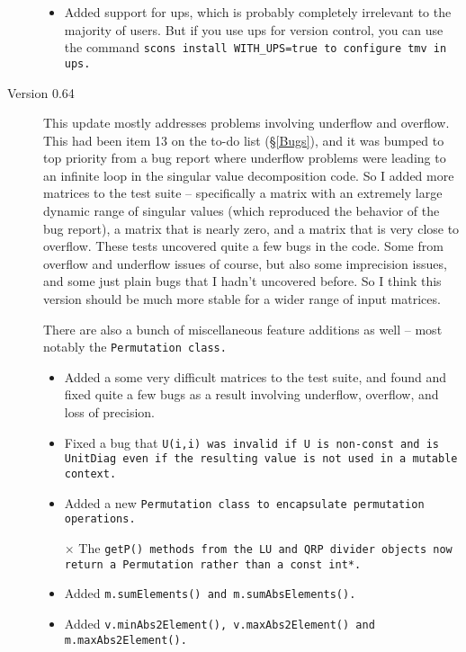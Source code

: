 \begin{description}
\begin{itemize}
\item
Added support for ups, which is probably completely irrelevant
to the majority of users.  But if you use ups for version control, you can
use the command \tt{scons install WITH\_UPS=true} to configure tmv in ups.

\end{itemize}

\item[Version 0.64]
This update mostly addresses problems involving underflow and overflow.  This had 
been item 13 on the to-do list (\S\ref{Bugs}), and it was bumped to top priority from
a bug report where underflow problems were leading to an infinite loop in the 
singular value decomposition code.  So I added more matrices to the test suite -- 
specifically a matrix with an extremely large dynamic range of singular values
(which reproduced the behavior of the bug report), a matrix that is nearly zero,
and a matrix that is very close to overflow.  These tests uncovered quite a few bugs 
in the code.  Some from overflow and underflow issues of course, but also some
imprecision issues, and some just plain bugs that I hadn't uncovered before.  So 
I think this version should be much more stable for a wider range of input matrices.

There are also a bunch of miscellaneous feature additions as well -- most notably the \tt{Permutation} class.

\begin{itemize}

\item
Added a some very difficult matrices to the test suite, and found and fixed quite a few 
bugs as a result involving underflow, overflow, and loss of precision.  

\item 
Fixed a bug that \tt{U(i,i)} was invalid if \tt{U} is non-const and is \tt{UnitDiag} even 
if the resulting value is not used in a mutable context.  

\item 
Added a new \tt{Permutation} class to encapsulate permutation operations.  

\item[$\times$] 
The \tt{getP()} methods from the LU and QRP divider objects now return
a \tt{Permutation} rather than a \tt{const int*}.  

\item 
Added \tt{m.sumElements()} and \tt{m.sumAbsElements()}.

\item 
Added \tt{v.minAbs2Element()}, \tt{v.maxAbs2Element()} and \tt{m.maxAbs2Element()}.


\end{itemize}
\end{description}
